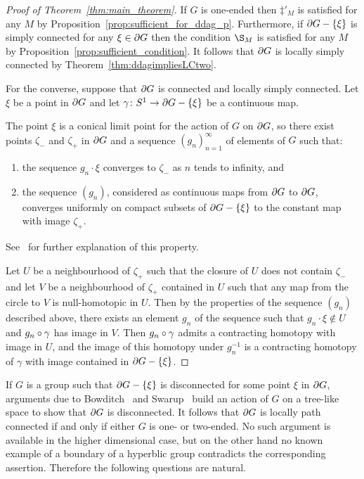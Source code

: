 \documentclass[a4paper]{article}
\begin{document}
\begin{proof}[Proof of Theorem~\ref{thm:main_theorem}]
  If $G$ is one-ended then $\ddag'_M$ is satisfied for any $M$ by
  Proposition~\ref{prop:sufficient_for_ddag_p}. Furthermore, if $\partial G -
  \left\{\xi\right\}$ is simply connected for any $\xi \in \partial G$ then the condition
  $\S_M$ is satisfied for any $M$ by
  Proposition~\ref{prop:sufficient_condition}. It follows that $\partial G$ is
  locally simply connected by Theorem~\ref{thm:ddagimpliesLCtwo}.

  For the converse, suppose that $\partial G$ is connected and locally simply
  connected. Let $\xi$ be a point in $\partial G$ and let $\gamma\colon
  S^1\to\partial G - \left\{\xi\right\}$ be a continuous map. 

  The point $\xi$ is a conical limit point for the action of $G$ on $\partial
  G$, so there exist points $\zeta_-$ and $\zeta_+$ in $\partial G$ and a
  sequence $(g_n)_{n = 1}^\infty$ of elements of $G$ such that:
  \begin{enumerate}
    \item the sequence $g_n\cdot\xi$ converges to $\zeta_-$ as $n$ tends to
      infinity, and
    \item the sequence $(g_n)$, considered as continuous maps from $\partial
      G$ to $\partial G$, converges uniformly on compact subsets of $\partial
      G - \left\{\xi\right\}$ to the constant map with image $\zeta_+$.
  \end{enumerate}
  See~\cite{bowditch99c} for further explanation of this property.

  Let $U$ be a neighbourhood of $\zeta_+$ such that the closure of $U$ does not
  contain $\zeta_-$ and let $V$ be a neighbourhood of $\zeta_+$ contained in
  $U$ such that any map from the circle to $V$ is null-homotopic in $U$. Then by
  the properties of the sequence $(g_n)$ described above, there exists an
  element $g_n$ of the sequence such that $g_n\cdot\xi \notin U$ and
  $g_n\circ\gamma$ has image in $V$. Then $g_n\circ\gamma$ admits a
  contracting homotopy with image in $U$, and the image of this homotopy under
  $g_n^{-1}$ is a contracting homotopy of $\gamma$ with image contained in
  $\partial G - \left\{\xi\right\}$.
\end{proof}

If $G$ is a group such that $\partial G - \left\{\xi\right\}$ is disconnected for some
point $\xi$ in $\partial G$, arguments due to Bowditch~\cite{bowditch98b} and
Swarup~\cite{swarup96} build an action of $G$ on a tree-like space to show that
$\partial G$ is disconnected. It follows that $\partial G$ is locally path
connected if and only if either $G$ is one- or two-ended. No such argument is
available in the higher dimensional case, but on the other hand no known
example of a boundary of a hyperblic group contradicts the corresponding
assertion. Therefore the following questions are natural.
\end{document}
